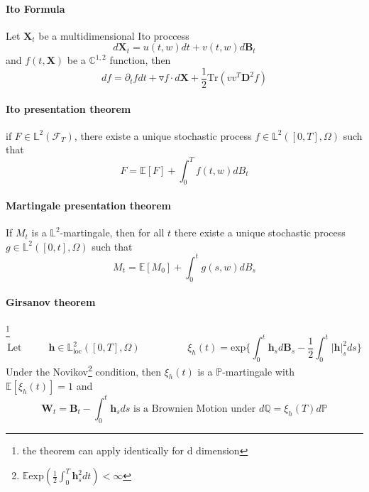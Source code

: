 \documentclass[a4paper,10pt]{article}
\begin{document}
\paragraph{Ito Formula}
Let $\textbf{X}_t$ be a multidimensional Ito proccess
\[
d\textbf{X}_t = u(t,w)dt + v(t,w)d\textbf{B}_t
\]
and $f(t,\textbf{X})$ be a $\mathbb{C}^{1,2}$ function, then
\[
df = \partial_t f dt + \triangledown f \cdot d\textbf{X} + \frac{1}{2} \text{Tr}(vv^T \textbf{D}^2f  )
\]
\paragraph{Ito presentation theorem}
if $F \in \mathbb{L}^2(\mathcal{F}_T)$, there existe a unique stochastic process $f\in \mathbb{L}^2([0,T],\Omega)$ such that
\[
F = \mathbb{E}[F] + \int_0^T f(t,w)dB_t
\]
\paragraph{Martingale presentation theorem}
If $M_t$ is a $\mathbb{L}^2$-martingale, then for all $t$ there existe a unique stochastic process $g\in \mathbb{L}^2([0,t],\Omega)$ such that
\[
M_t = \mathbb{E}[M_0] + \int_0^t g(s,w)dB_s
\]
\paragraph{Girsanov theorem}\footnote{the theorem can apply identically for d dimension}
\[
\text{Let }\hspace{1cm}
\textbf{h}\in \mathbb{L}_{\text{loc}}^2([0,T],\Omega)
\hspace{2cm}
\xi_h(t) = \text{exp}\{ \int_0^t \textbf{h}_s d\textbf{B}_s - \frac{1}{2} \int_0^t |\textbf{h}|_s^2 ds \}
\]
Under the Novikov\footnote{$\mathbb{E}\text{exp}(\frac{1}{2}\int_0^T \textbf{h}^2_sdt) < \infty $} condition, then $\xi_h(t)$ is a $\mathbb{P}$-martingale with $\mathbb{E}[\xi_h(t)]=1$ and
\[
\textbf{W}_t = \textbf{B}_t - \int_0^t \textbf{h}_sds \text{ is a Brownien Motion under }d\mathbb{Q} =\xi_h(T) d\mathbb{P}
\]
\end{document}
